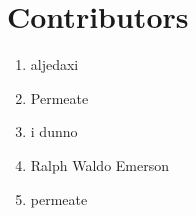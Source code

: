 \section{Contributors}
\begin{enumerate}
	\item aljedaxi
	\item Permeate
	\item i dunno
	\item Ralph Waldo Emerson
	\item permeate
\end{enumerate}
